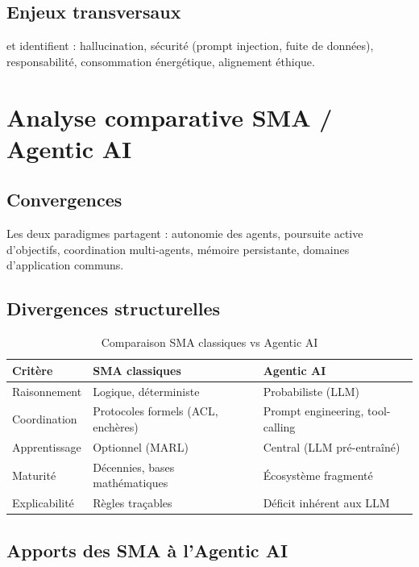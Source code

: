 \documentclass[12pt,a4paper]{report}
\begin{document}
\subsection{Enjeux transversaux}

\citet{hughes2025} et \citet{patel2025} identifient : hallucination, sécurité
(prompt injection, fuite de données), responsabilité, consommation énergétique,
alignement éthique.

\section{Analyse comparative SMA / Agentic AI}
\label{sec:comparatif}

\subsection{Convergences}

Les deux paradigmes partagent \citep{analyse_comparative} :
autonomie des agents, poursuite active d'objectifs, coordination multi-agents,
mémoire persistante, domaines d'application communs.

\subsection{Divergences structurelles}

\begin{table}[H]
\centering
\caption{Comparaison SMA classiques vs Agentic AI}
\label{tab:comparatif}
\begin{tabularx}{\textwidth}{L{3.2cm}L{5cm}L{5cm}}
\toprule
\textbf{Critère} & \textbf{SMA classiques} & \textbf{Agentic AI} \\
\midrule
Raisonnement & Logique, déterministe & Probabiliste (LLM) \\
\addlinespace
Coordination & Protocoles formels (ACL, enchères) & Prompt engineering, tool-calling \\
\addlinespace
Apprentissage & Optionnel (MARL) & Central (LLM pré-entraîné) \\
\addlinespace
Maturité & Décennies, bases mathématiques & Écosystème fragmenté \\
\addlinespace
Explicabilité & Règles traçables & Déficit inhérent aux LLM \\
\bottomrule
\end{tabularx}
\end{table}

\subsection{Apports des SMA à l'Agentic AI}
\end{document}
